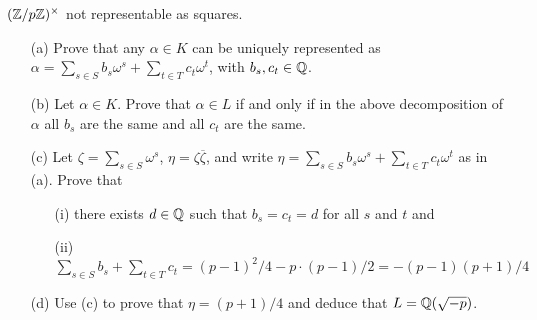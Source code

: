 \documentclass[12pt]{article}
\begin{document}
$({\mathbb Z}/p{\mathbb Z})^{\times}$ not representable as squares.
\begin{itemize}
\item[(a)] Prove that any $\alpha\in K$ can be uniquely represented
as $\alpha=\sum_{s\in S}b_s \omega^s+\sum_{t\in T}c_t \omega^t$,
with $b_s,c_t\in{\mathbb Q}$.
\item[(b)] Let $\alpha\in K$. Prove that $\alpha\in L$ if and only
if in the above decomposition of $\alpha$ all $b_s$ are the same
and all $c_t$ are the same.
\item[(c)] Let $\zeta=\sum_{s\in S}\omega^s$, $\eta=\zeta\overline\zeta$,
and write $\eta=\sum_{s\in S}b_s \omega^s+\sum_{t\in T}c_t \omega^t$ as in (a).
Prove that 
\begin{itemize}
\item[(i)] there exists $d\in {\mathbb Q}$ such that $b_s=c_t=d$
for all $s$ and $t$ and
\item[(ii)] $\sum_{s\in S}b_s+\sum_{t\in T}c_t=(p-1)^2/4-p\cdot (p-1)/2=-(p-1)(p+1)/4$
\end{itemize}
\item[(d)] Use (c) to prove that $\eta=(p+1)/4$ and deduce that 
$L={\mathbb Q}(\sqrt{-p})$.
\end{itemize}
\end{document}
